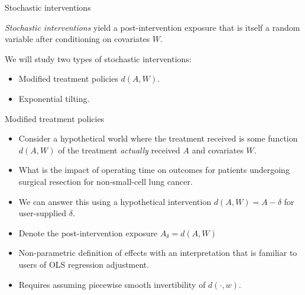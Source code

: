 \documentclass{beamer}
\begin{document}
\begin{frame}{Stochastic interventions}
  \begin{definition}
    \textit{Stochastic interventions} yield a post-intervention exposure that
    is itself a random variable after conditioning on covariates $W$.
  \end{definition}

\vspace{2mm}

  We will study two types of stochastic interventions:
  \begin{itemize}
    \item Modified treatment policies $d(A,W)$.
    \item Exponential tilting.
  \end{itemize}

\note{
}

\end{frame}


\begin{frame}{Modified treatment policies}
    \begin{itemize}
      \item Consider a hypothetical world where the treatment received is
        some function $d(A,W)$ of the treatment \textit{actually} received
        $A$ and covariates $W$.
    \end{itemize}
    \begin{example}
      \begin{itemize}
        \item What is the impact of operating time on outcomes for patients
          undergoing surgical resection for non-small-cell lung cancer.
        \item We can answer this using a hypothetical intervention
          $d(A,W) = A-\delta$ for user-supplied $\delta$.
        \item Denote the post-intervention exposure $A_\delta = d(A,W)$
        \item Non-parametric definition of effects with an interpretation
          that is familiar to users of OLS regression adjustment.
        \item Requires assuming piecewise smooth invertibility of
        $d(\cdot, w)$.
      \end{itemize}
    \end{example}

\note{
}

\end{frame}
\end{document}
